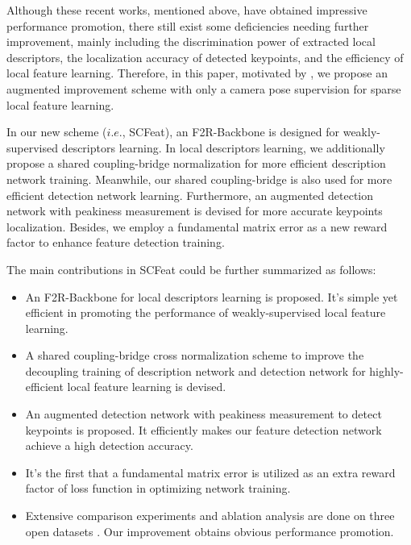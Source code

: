 \documentclass[journal]{IEEEtran}
\begin{document}
Although these recent works, mentioned above, have obtained impressive performance promotion, there still exist some deficiencies needing further improvement, mainly including the discrimination power of extracted local descriptors, the localization accuracy of detected keypoints, and the efficiency of local feature learning. Therefore, in this paper, motivated by \cite{li2022decoupling,caps,cndesc,aslfeat}, we propose an augmented improvement scheme with only a camera pose supervision for sparse local feature learning. 

In our new scheme ($i.e.$, SCFeat), an F2R-Backbone is designed for weakly-supervised descriptors learning. In local descriptors learning, we additionally propose a shared coupling-bridge normalization for more efficient description network training. Meanwhile, our shared coupling-bridge is also used for more efficient detection network learning. Furthermore, an augmented detection network with peakiness measurement is devised for more accurate keypoints localization.
Besides, we employ a fundamental matrix error as a new reward factor to enhance feature detection training. 


The main contributions in SCFeat could be further summarized as follows:
\begin{itemize}
\item{An F2R-Backbone for local descriptors learning is proposed. It's simple yet efficient in promoting the performance of weakly-supervised local feature learning.}

\item{A shared coupling-bridge cross normalization scheme to improve the decoupling training of description network and detection network for highly-efficient local feature learning is devised.}

\item{An augmented detection network with peakiness measurement to detect keypoints is proposed. It efficiently makes our feature detection network achieve a high detection accuracy.}

\item{It's the first that a fundamental matrix error is utilized as an extra reward factor of loss function in optimizing network training.}

\item{Extensive comparison experiments and ablation analysis are done on three open datasets \cite{HPatches,aachen,ETH}. Our improvement obtains obvious performance promotion.}
\end{itemize}
\end{document}
